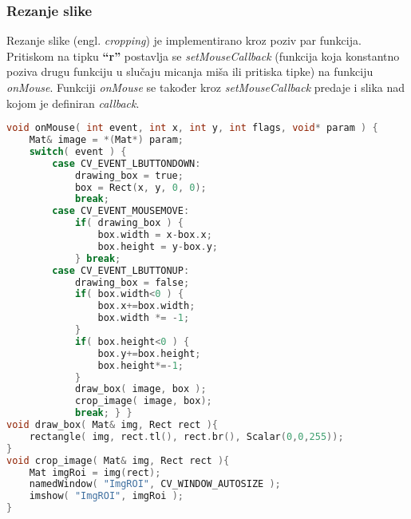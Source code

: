 \newpage
\subsubsection{Rezanje slike}
Rezanje slike (engl. \textit{cropping}) je implementirano kroz poziv par
funkcija. Pritiskom na tipku \textbf{``r''} postavlja se
\textit{setMouseCallback} (funkcija koja konstantno poziva drugu
funkciju u slučaju micanja miša ili pritiska tipke) na funkciju
\textit{onMouse}. Funkciji \textit{onMouse} se također kroz
\textit{setMouseCallback} predaje i slika nad kojom je definiran
\textit{callback}.
\\

\begin{lstlisting}[language=C,caption={Rezanje slike}]
void onMouse( int event, int x, int y, int flags, void* param ) {
    Mat& image = *(Mat*) param;
    switch( event ) {
        case CV_EVENT_LBUTTONDOWN:
            drawing_box = true;
            box = Rect(x, y, 0, 0);
            break;
        case CV_EVENT_MOUSEMOVE: 
            if( drawing_box ) {
                box.width = x-box.x;
                box.height = y-box.y;
            } break;
        case CV_EVENT_LBUTTONUP: 
            drawing_box = false;
            if( box.width<0 ) {
                box.x+=box.width;
                box.width *= -1;
            }
            if( box.height<0 ) {
                box.y+=box.height;
                box.height*=-1;
            }
            draw_box( image, box );
            crop_image( image, box);
            break; } } 
void draw_box( Mat& img, Rect rect ){
    rectangle( img, rect.tl(), rect.br(), Scalar(0,0,255));
}
void crop_image( Mat& img, Rect rect ){
    Mat imgRoi = img(rect);
    namedWindow( "ImgROI", CV_WINDOW_AUTOSIZE );
    imshow( "ImgROI", imgRoi );
}
\end{lstlisting}


\newpage
